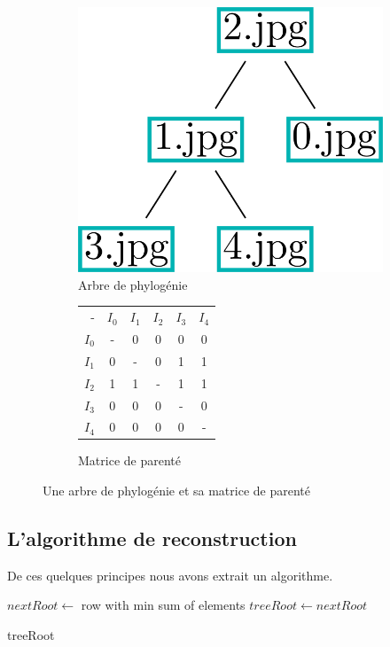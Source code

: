 \documentclass[utf8]{stageM2R} %
\begin{document}
\begin{figure}
  \begin{subfigure}{.5\textwidth}
    \centering
    \includegraphics[width=.5\linewidth]{images/algo_tree.png}
    \caption{Arbre de phylogénie}
    \label{algo_tree}
  \end{subfigure}%
  \begin{subfigure}{.5\textwidth}
    \centering
    \begin{tabular}{|r||c|c|c|c|c|}
      - & $I_{0}$ & $I_{1}$ & $I_{2}$ & $I_{3}$ & $I_{4}$ \\ \hhline{|=::=|=|=|=|=|}
      $I_{0}$ & - & 0 & 0 & 0 & 0 \\ \hline
      $I_{1}$ & 0 & - & 0 & 1 & 1 \\ \hline
      $I_{2}$ & 1 & 1 & - & 1 & 1 \\ \hline
      $I_{3}$ & 0 & 0 & 0 & - & 0 \\ \hline
      $I_{4}$ & 0 & 0 & 0 & 0 & - \\ \hline
    \end{tabular} 
    \caption{Matrice de parenté}
    \label{parentage_matrix}
  \end{subfigure}
  \caption{Une arbre de phylogénie et sa matrice de parenté}
  \label{parentage_tree}
\end{figure}

\subsection{L'algorithme de reconstruction}
De ces quelques principes nous avons extrait un algorithme. \vspace{5mm}

\begin{algorithm}[H]
  \LinesNumbered
  \BlankLine
  $nextRoot \leftarrow$ row with min sum of elements\;
  $treeRoot \leftarrow nextRoot$\;
  \BlankLine

  \KwRet treeRoot
\end{algorithm}
\vspace{5mm}
\end{document}
